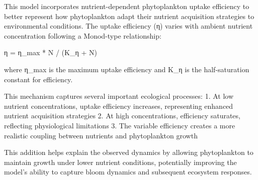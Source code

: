 This model incorporates nutrient-dependent phytoplankton uptake efficiency to better represent how phytoplankton adapt their nutrient acquisition strategies to environmental conditions. The uptake efficiency (η) varies with ambient nutrient concentration following a Monod-type relationship:

η = η_max * N / (K_η + N)

where η_max is the maximum uptake efficiency and K_η is the half-saturation constant for efficiency.

This mechanism captures several important ecological processes:
1. At low nutrient concentrations, uptake efficiency increases, representing enhanced nutrient acquisition strategies
2. At high concentrations, efficiency saturates, reflecting physiological limitations
3. The variable efficiency creates a more realistic coupling between nutrients and phytoplankton growth

This addition helps explain the observed dynamics by allowing phytoplankton to maintain growth under lower nutrient conditions, potentially improving the model's ability to capture bloom dynamics and subsequent ecosystem responses.
